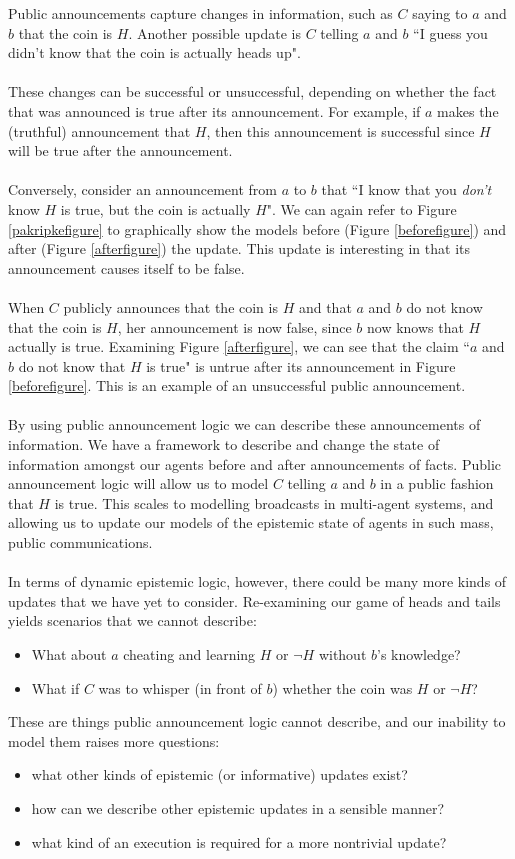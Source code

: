 Public announcements capture changes in information, such as $C$ saying to
$a$ and $b$ that the coin is $H$.
Another possible update is $C$ telling $a$ and $b$ ``I guess you didn't know that the coin is actually heads up".\\
\\
These changes can be successful or unsuccessful, depending on whether the fact
that was announced is true after its announcement.
For example, if $a$ makes the (truthful) announcement that $H$, then this
announcement is successful since $H$ will be true after the announcement.\\
\\
Conversely, consider an announcement from $a$ to $b$ that ``I know that you {\em don't} know $H$
is true, but the coin is actually $H$".
We can again refer to Figure \ref{pakripkefigure} to graphically show the models
before (Figure \ref{beforefigure}) and after (Figure \ref{afterfigure}) the update.
This update is interesting in that its announcement causes itself to be false.\\
\\
When $C$ publicly announces that the coin is $H$ and that $a$ and $b$ do not know that
the coin is $H$, her announcement is now false, since $b$ now knows that $H$
actually is true.
Examining Figure \ref{afterfigure}, we can see that the claim ``$a$ and $b$ do not know that $H$ is
true" is untrue after its announcement in Figure \ref{beforefigure}.
This is an example of an unsuccessful public announcement.\\
\\
By using public announcement logic we can describe these announcements of
information.
We have a framework to describe and change the state of information amongst our
agents before and after announcements of facts.
Public announcement logic will allow us to model $C$ telling $a$ and $b$ in a
public fashion that $H$ is true.
This scales to modelling broadcasts in multi-agent systems, and allowing us to
update our models of the epistemic state of agents in such mass, public communications.\\
\\
In terms of dynamic epistemic logic, however, there could be many more kinds of
updates that we have yet to consider.
Re-examining our game of heads and tails yields scenarios that we cannot
describe:
\begin{itemize}
	\item What about $a$ cheating and learning $H$ or $\neg H$ without $b$'s knowledge?
	\item What if $C$ was to whisper (in front of $b$) whether the coin was $H$
	or $\neg H$?
\end{itemize}
These are things public announcement logic cannot describe, and our inability to
model them raises more questions:
\begin{itemize}
	\item what other kinds of epistemic (or informative) updates exist?
	\item how can we describe other epistemic updates in a sensible manner?
	\item what kind of an execution is required for a more nontrivial update?
\end{itemize}

